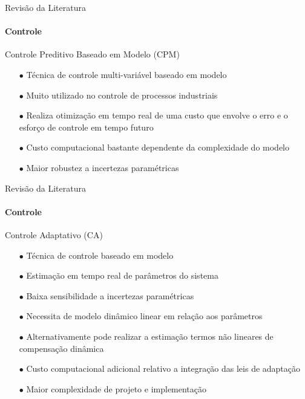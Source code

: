 \documentclass[25pt,landscape]{beamer}
\begin{document}
\begin{frame}{Revisão da Literatura}
    \framesubtitle{Controle}
    \begin{block}{Controle Preditivo Baseado em Modelo (CPM)}
        \begin{itemize}
            \item[$\bullet$] Técnica de controle multi-variável baseado em modelo \\[8pt]
            \item[$\bullet$] Muito utilizado no controle de processos industriais \\[8pt]
            \item[$\bullet$] Realiza otimização em tempo real de uma custo que envolve o erro e o esforço de controle em tempo futuro \\[8pt]
            \item[$\bullet$] Custo computacional bastante dependente da complexidade do modelo \\[8pt]
            \item[$\bullet$] Maior robustez a incertezas paramétricas  \\[8pt]
        \end{itemize}
    \end{block}
\end{frame}

\begin{frame}{Revisão da Literatura}
    \framesubtitle{Controle}
    \begin{block}{Controle Adaptativo (CA)}
        \begin{itemize}
            \item[$\bullet$] Técnica de controle baseado em modelo \\[8pt]
            \item[$\bullet$] Estimação em tempo real de parâmetros do sistema \\[8pt]
            \item[$\bullet$] Baixa sensibilidade a incertezas paramétricas \\[8pt]
            \item[$\bullet$] Necessita de modelo dinâmico linear em relação aos parâmetros \\[8pt]
            \item[$\bullet$] Alternativamente pode realizar a estimação termos não lineares de compensação dinâmica \\[8pt]
            \item[$\bullet$] Custo computacional adicional relativo a integração das leis de adaptação \\[8pt]
            \item[$\bullet$] Maior complexidade de projeto e implementação \\[8pt]
        \end{itemize}
    \end{block}
\end{frame}
\end{document}
